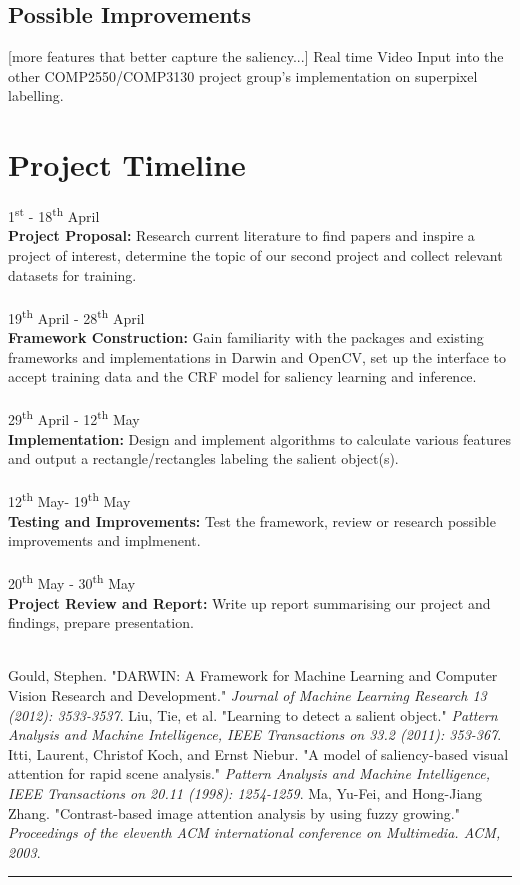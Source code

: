 \documentclass[12pt,a4paper]{article}
\newcommand{\BOLD}{\textbf}
\newcommand{\Hrule}{\textcolor{blue}{\rule{\linewidth}{0.5mm}}}
\newcommand{\SUPER}{\textsuperscript}
\newcommand{\TIMELINE}[3]{#1\\\BOLD{#2} #3\\\\}
\begin{document}
\begin{multicols}{2}
\subsection{Possible Improvements}
[more features that better capture the saliency...]
Real time
Video
Input into the other COMP2550/COMP3130 project group's implementation on superpixel labelling.

\section{Project Timeline}
\TIMELINE{1\SUPER{st}  - 18\SUPER{th} April}{Project Proposal:}{Research current literature to find papers and inspire a project of interest, determine the topic of our second project and collect relevant datasets for training.}
%
\TIMELINE{19\SUPER{th} April - 28\SUPER{th} April}{Framework Construction:}{Gain familiarity with the packages and existing frameworks and implementations in Darwin and OpenCV, set up the interface to accept training data and the CRF model for saliency learning and inference.}
%
\TIMELINE{29\SUPER{th} April - 12\SUPER{th} May}{Implementation:}{Design and implement algorithms to calculate various features and output a rectangle/rectangles labeling the salient object(s).}
%
\TIMELINE{12\SUPER{th} May- 19\SUPER{th} May}{Testing and Improvements:}{Test the framework, review or research possible improvements and implmenent.}
%
\TIMELINE{20\SUPER{th} May - 30\SUPER{th} May}{Project Review and Report:}{Write up report summarising our project and findings, prepare presentation.}
\begin{thebibliography}{8}
    \footnotesize
     Gould, Stephen. "DARWIN: A Framework for Machine Learning and Computer Vision Research and Development." \textit{Journal of Machine Learning Research 13 (2012): 3533-3537}. 
     Liu, Tie, et al. "Learning to detect a salient object." \textit{Pattern Analysis and Machine Intelligence, IEEE Transactions on 33.2 (2011): 353-367}. 
     Itti, Laurent, Christof Koch, and Ernst Niebur. "A model of saliency-based visual attention for rapid scene analysis."\textit{ Pattern Analysis and Machine Intelligence, IEEE Transactions on 20.11 (1998): 1254-1259}.
     Ma, Yu-Fei, and Hong-Jiang Zhang. "Contrast-based image attention analysis by using fuzzy growing."\textit{ Proceedings of the eleventh ACM international conference on Multimedia. ACM, 2003}. 
\end{thebibliography}

\end{multicols}
\vfill\Hrule
\end{document}
